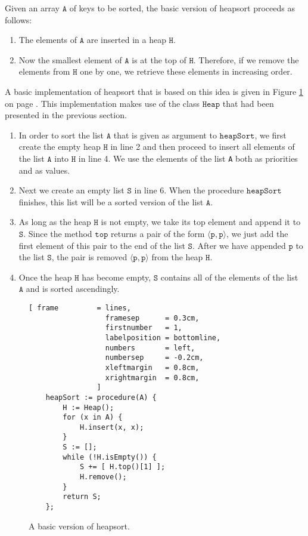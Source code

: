Given an array $\texttt{A}$ of keys to be sorted, the basic version of heapsort proceeds as follows:
\begin{enumerate}
\item The elements of $\texttt{A}$ are inserted in a heap $\texttt{H}$.
\item Now the smallest element of $\texttt{A}$ is at the top of $\texttt{H}$.  Therefore, if we remove the elements
      from $\texttt{H}$ one by one, we retrieve these elements in increasing order.
\end{enumerate}
A basic implementation of heapsort that is based on this idea is given in Figure
\ref{fig:basic-heapsort.stlx} on page \pageref{fig:basic-heapsort.stlx}.  This implementation makes
use of the class $\texttt{Heap}$ that had been presented in the previous section.
\begin{enumerate}
\item In order to sort the list $\texttt{A}$ that is given as argument to $\texttt{heapSort}$, we first
      create the empty heap 
      $\texttt{H}$ in line 2 and then proceed to insert all elements of the list $\texttt{A}$ into $\texttt{H}$ 
      in line 4.  We use the elements of the list \texttt{A} both as priorities and as values.
\item Next we create an empty list $\texttt{S}$ in line 6. When the procedure $\texttt{heapSort}$
      finishes, this list will be a sorted version of the list $\texttt{A}$.
\item As long as the heap $\texttt{H}$ is not empty, we take its top element and append it to
      $\texttt{S}$.  Since the method $\texttt{top}$ returns a pair of the form $\langle \texttt{p}, \texttt{p}\rangle$,
      we just add the first element of this pair to the
      end of the list $\texttt{S}$.  After we have appended $\texttt{p}$ to the list $\texttt{S}$, the pair
      is removed $\langle \texttt{p}, \texttt{p}\rangle$ from the heap $\texttt{H}$.
\item Once the heap $\texttt{H}$ has become empty, $\texttt{S}$ contains all of the elements of the list $\texttt{A}$
      and is sorted ascendingly.
\end{enumerate}

\begin{figure}[!ht]
\centering
\begin{Verbatim}[ frame         = lines, 
                  framesep      = 0.3cm, 
                  firstnumber   = 1,
                  labelposition = bottomline,
                  numbers       = left,
                  numbersep     = -0.2cm,
                  xleftmargin   = 0.8cm,
                  xrightmargin  = 0.8cm,
                ]
    heapSort := procedure(A) {
        H := Heap();    
        for (x in A) {
            H.insert(x, x);
        }
        S := [];
        while (!H.isEmpty()) {
            S += [ H.top()[1] ];
            H.remove();
        }
        return S;
    };
\end{Verbatim}
\vspace*{-0.3cm}
\caption{A basic version of heapsort.}
\label{fig:basic-heapsort.stlx}
\end{figure}

